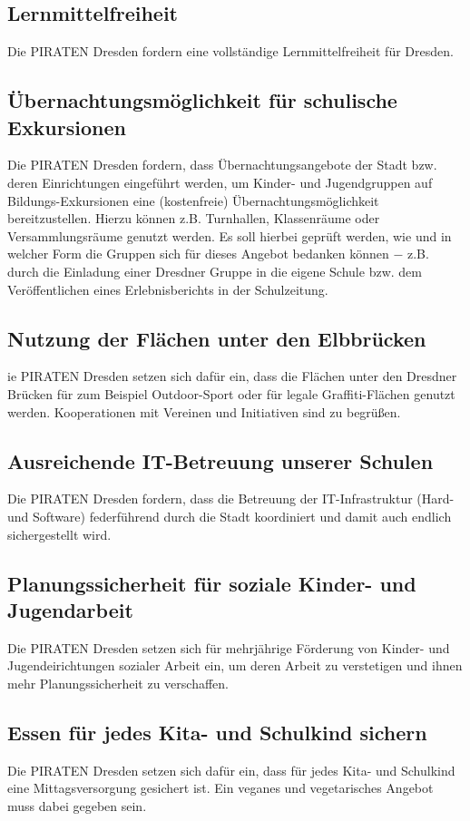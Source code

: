 \documentclass[a4paper, 11pt]{article}
\begin{document}
\subsection{Lernmittelfreiheit}
Die PIRATEN Dresden fordern eine vollständige Lernmittelfreiheit für Dresden.


\subsection{Übernachtungsmöglichkeit für schulische Exkursionen}
Die PIRATEN Dresden fordern, dass Übernachtungsangebote der Stadt bzw. deren Einrichtungen eingeführt werden, um Kinder- und Jugendgruppen auf Bildungs-Exkursionen eine (kostenfreie) Übernachtungsmöglichkeit bereitzustellen. Hierzu können z.B. Turnhallen, Klassenräume oder Versammlungsräume genutzt werden. Es soll hierbei geprüft werden, wie und in welcher Form die Gruppen sich für dieses Angebot bedanken können $-$ z.B.~ durch die Einladung einer Dresdner Gruppe in die eigene Schule bzw. dem Veröffentlichen eines Erlebnisberichts in der Schulzeitung.


\subsection{Nutzung der Flächen unter den Elbbrücken }
ie PIRATEN Dresden setzen sich dafür ein, dass die Flächen unter den Dresdner Brücken für zum Beispiel Outdoor-Sport oder für legale Graffiti-Flächen genutzt werden. Kooperationen mit Vereinen und Initiativen sind zu begrüßen.


\subsection{Ausreichende IT-Betreuung unserer Schulen}
Die PIRATEN Dresden fordern, dass die Betreuung der IT-Infrastruktur (Hard- und Software) federführend durch die Stadt koordiniert und damit auch endlich sichergestellt wird.


\subsection{Planungssicherheit für soziale Kinder- und Jugendarbeit}
Die PIRATEN Dresden setzen sich für mehrjährige Förderung von Kinder- und Jugendeirichtungen sozialer Arbeit ein, um deren Arbeit zu verstetigen und ihnen mehr Planungssicherheit zu verschaffen.


\subsection{Essen für jedes Kita- und Schulkind sichern}
Die PIRATEN Dresden setzen sich dafür ein, dass für jedes Kita- und Schulkind eine Mittagsversorgung gesichert ist. Ein veganes und vegetarisches Angebot muss dabei gegeben sein.
\end{document}
